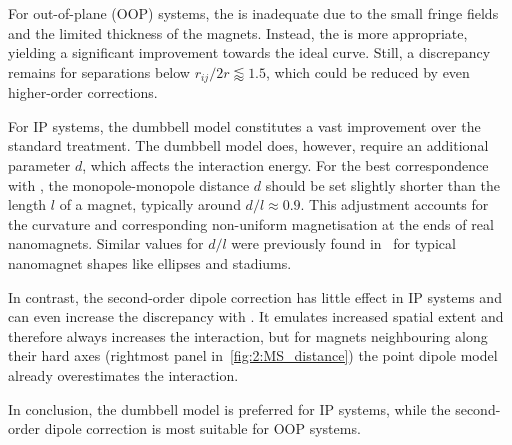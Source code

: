 For out-of-plane (OOP) systems, the  is inadequate due to the small fringe fields and the limited thickness of the magnets.
Instead, the  is more appropriate, yielding a significant improvement towards the ideal \mumax curve.
Still, a discrepancy remains for separations below $r_{ij}/2r \lessapprox 1.5$, which could be reduced by even higher-order corrections. \\\par

For IP systems, the dumbbell model constitutes a vast improvement over the standard  treatment.
The dumbbell model does, however, require an additional parameter $d$, which affects the interaction energy.
For the best correspondence with \mumax, the monopole-monopole distance $d$ should be set slightly shorter than the length $l$ of a magnet, typically around $d/l\approx0.9$.
This adjustment accounts for the curvature and corresponding non-uniform magnetisation at the ends of real nanomagnets.
Similar values for $d/l$ were previously found in~ for typical nanomagnet shapes like ellipses and stadiums. \par
In contrast, the second-order dipole correction has little effect in IP systems and can even increase the discrepancy with \mumax.
It emulates increased spatial extent and therefore always increases the interaction, but for magnets neighbouring along their hard axes (rightmost panel in~\cref{fig:2:MS_distance}) the point dipole model already overestimates the interaction. \par
In conclusion, the dumbbell model is preferred for IP systems, while the second-order dipole correction is most suitable for OOP systems.

